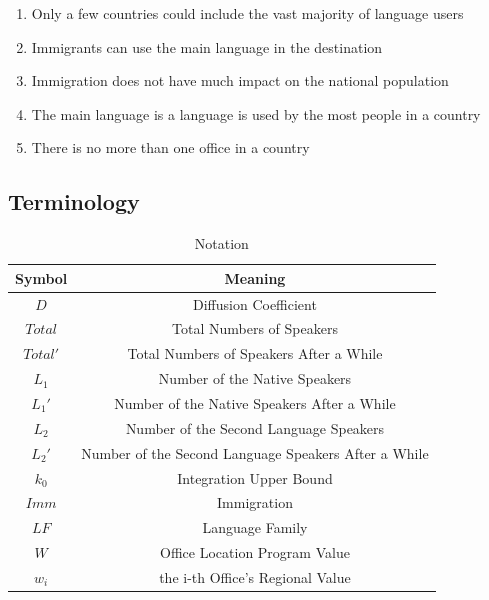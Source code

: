 \documentclass{mcmthesis}
\begin{document}
    \begin{enumerate}

    \item Only a few countries could include the vast majority of language users
    \item Immigrants can use the main language in the destination
    \item Immigration does not have much impact on the national population
    \item The main language is a language is used by the most people in a country
    \item There is no more than one office in a country
    \end{enumerate}


    \subsection{Terminology}%

    \begin{table}[h]
      \centering
      \caption{Notation}

      \begin{tabular}{cc}
        \toprule%
        Symbol&Meaning\\
        \midrule%
        {$D$}&Diffusion Coefficient\\
        {$Total$}&Total Numbers of Speakers\\
        {$Total'$}&Total Numbers of Speakers After a While\\
        {$L_1$}&Number of the Native Speakers\\
        {$L_1'$}&Number of the Native Speakers After a While\\
        {$L_2$}&Number of the Second Language Speakers\\
        {$L_2'$}&Number of the Second Language Speakers After a While\\
        {$k_0$}&Integration Upper Bound\\
        {$Imm$}&Immigration\\
        {$LF$}&Language Family\\
        {$W$}&Office Location Program Value\\
        {$w_i$}&the i-th Office's Regional Value\\

        \bottomrule%
      \end{tabular}
    \end{table}
\end{document}
